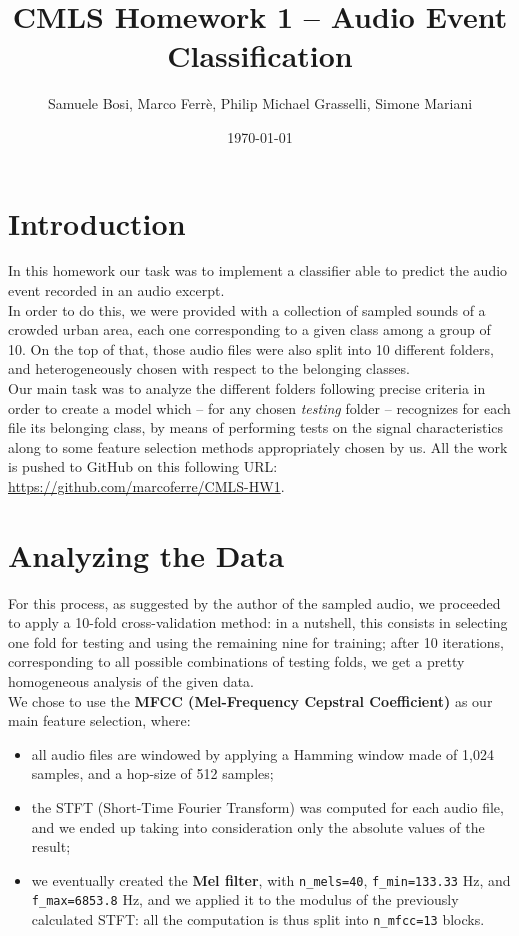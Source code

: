 \documentclass[11pt]{article}
\author{Samuele Bosi, Marco Ferrè, Philip Michael Grasselli, Simone Mariani}
\title{\textbf{CMLS Homework 1 – Audio Event Classification}}
\date{\today}
\begin{document}
\maketitle
\tableofcontents

\section{Introduction}
In this homework our task was to implement a classifier able to predict the audio event recorded in an audio excerpt.\\
In order to do this, we were provided with a collection of sampled sounds of a crowded urban area, each one corresponding to a given class among a group of 10. On the top of that, those audio files were also split into 10 different folders, and heterogeneously chosen with respect to the belonging classes.\\
Our main task was to analyze the different folders following precise criteria in order to create a model which -- for any chosen \textit{testing} folder -- recognizes for each file its belonging class, by means of performing tests on the signal characteristics along to some feature selection methods appropriately chosen by us.
All the work is pushed to GitHub on this following URL: \url{https://github.com/marcoferre/CMLS-HW1}.

\section{Analyzing the Data}

For this process, as suggested by the author of the sampled audio, we proceeded to apply a 10-fold cross-validation method: in a nutshell, this consists in selecting one fold for testing and using the remaining nine for training; after 10 iterations, corresponding to all possible combinations of testing folds, we get a pretty homogeneous analysis of the given data.\\
We chose to use the \textbf{MFCC (Mel-Frequency Cepstral Coefficient)} as our main feature selection, where:
\begin{itemize}
\item all audio files are windowed by applying a Hamming window made of 1,024 samples, and a hop-size of 512 samples;
\item the STFT (Short-Time Fourier Transform) was computed for each audio file, and we ended up taking into consideration only the absolute values of the result;
\item we eventually created the \textbf{Mel filter}, with \texttt{n{\_}mels=40}, \texttt{f{\_}min=133.33} Hz, and \texttt{f{\_}max=6853.8} Hz, and we applied it to the modulus of the previously calculated STFT: all the computation is thus split into \texttt{n{\_}mfcc=13} blocks.
\end{itemize}
\end{document}
